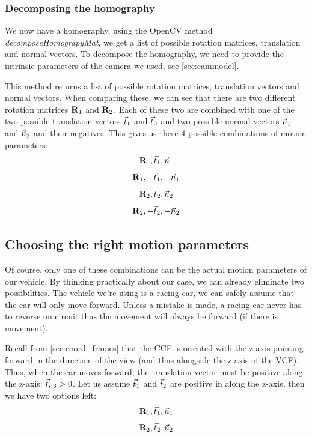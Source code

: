 \subsubsection{Decomposing the homography}
We now have a homography, using the OpenCV method \textit{decomposeHomograpyMat}, we get a list of possible rotation matrices, translation and normal vectors. To decompose the homography, we need to provide the intrinsic parameters of the camera we used, see \autoref{sec:cammodel}.\bigskip

This method returns a list of possible rotation matrices, translation vectors and normal vectors. When comparing these, we can see that there are two different rotation matrices $\mathbf{R}_1$ and $\mathbf{R}_2$. Each of these two are combined with one of the two possible translation vectors $\vec t_1$ and $\vec t_2$ and two possible normal vectors $\vec n_1$ and $\vec n_2$ and their negatives. This gives us these 4 possible combinations of motion parameters:
\begin{equation*}
    \mathbf{R}_1, \vec t_1, \vec n_1
\end{equation*}
\begin{equation*}
    \mathbf{R}_1, -\vec t_1, -\vec n_1
\end{equation*}
\begin{equation*}
    \mathbf{R}_2, \vec t_2, \vec n_2
\end{equation*}
\begin{equation*}
    \mathbf{R}_2, -\vec t_2, -\vec n_2
\end{equation*}

\subsection{Choosing the right motion parameters}
Of course, only one of these combinations can be the actual motion parameters of our vehicle. By thinking practically about our case, we can already eliminate two possibilities. The vehicle we're using is a racing car, we can safely assume that the car will only move forward. Unless a mistake is made, a racing car never has to reverse on circuit thus the movement will always be forward (if there is movement).\bigskip

Recall from \autoref{sec:coord_frames} that the CCF is oriented with the z-axis pointing forward in the direction of the view (and thus alongside the z-axis of the VCF). Thus, when the car moves forward, the translation vector must be positive along the z-axis: $\vec t_{i,3} > 0$. Let us assume $\vec t_1$ and $\vec t_2$ are positive in along the z-axis, then we have two options left:
\begin{equation*}
    \mathbf{R}_1, \vec t_1, \vec n_1
\end{equation*}
\begin{equation*}
    \mathbf{R}_2, \vec t_2, \vec n_2
\end{equation*}

